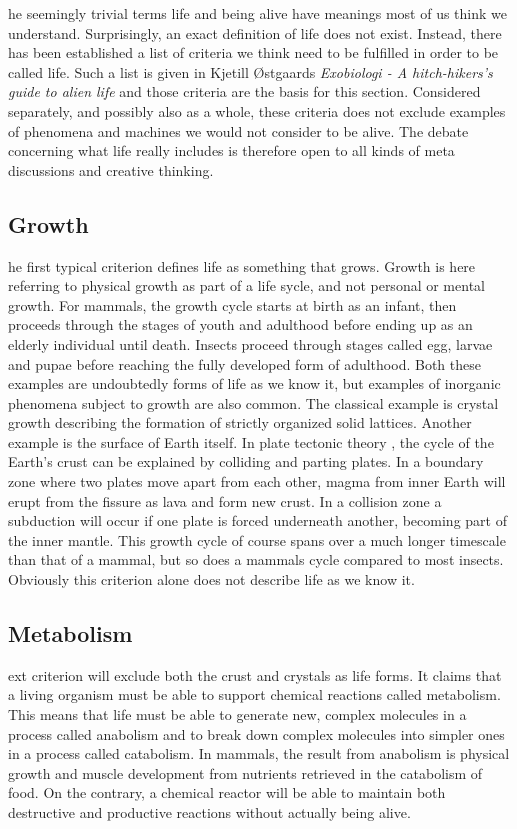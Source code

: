 he seemingly trivial terms life and being alive have meanings most of us think we understand.
Surprisingly, an exact definition of life does not exist.
Instead, there has been established a list of criteria we think need to be fulfilled in order to be called life.
Such a list is given in Kjetill Østgaards \textit{Exobiologi - A hitch-hikers's guide to alien life} \cite{Exoboken} and those criteria are the basis for this section.
Considered separately, and possibly also as a whole, these criteria does not exclude examples of phenomena and machines we would not consider to be alive.
The debate concerning what life really includes is therefore open to all kinds of meta discussions and creative thinking.

\subsection{Growth}
he first typical criterion defines life as something that grows.
Growth is here referring to physical growth as part of a life sycle, and not personal or mental growth.
For mammals, the growth cycle starts at birth as an infant, then proceeds through the stages of youth and adulthood before ending up as an elderly individual until death.
Insects proceed through stages called egg, larvae and pupae before reaching the fully developed form of adulthood.
Both these examples are undoubtedly forms of life as we know it, but examples of inorganic phenomena subject to growth are also common.
The classical example is crystal growth describing the formation of strictly organized solid lattices.
Another example is the surface of Earth itself.
In plate tectonic theory \cite{tectonic}, the cycle of the Earth's crust can be explained by colliding and parting plates.
In a boundary zone where two plates move apart from each other, magma from inner Earth will erupt from the fissure as lava and form new crust.
In a collision zone a subduction will occur if one plate is forced underneath another, becoming part of the inner mantle.
This growth cycle of course spans over a much longer timescale than that of a mammal, but so does a mammals cycle compared to most insects.
Obviously this criterion alone does not describe life as we know it.

\subsection{Metabolism}
ext criterion will exclude both the crust and crystals as life forms.
It claims that a living organism must be able to support chemical reactions called metabolism.
This means that life must be able to generate new, complex molecules in a process called anabolism and to break down complex molecules into simpler ones in a process called catabolism.
In mammals, the result from anabolism is physical growth and muscle development from nutrients retrieved in the catabolism of food.
On the contrary, a chemical reactor will be able to maintain both destructive and productive reactions without actually being alive.

